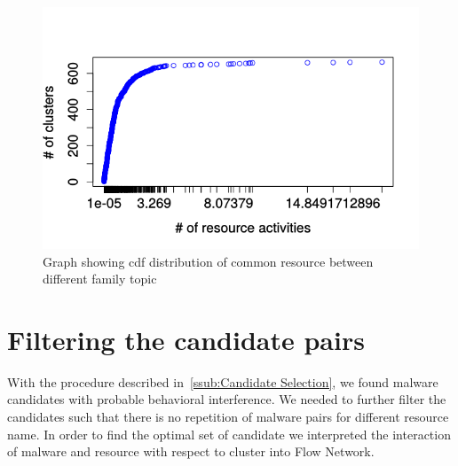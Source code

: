 \begin{figure}[htbp]
\begin{center}
  \includegraphics[scale=0.7]{figures/inter_clustered_common.png}
\end{center}
\captionsetup{font=small}
\caption{Graph showing cdf distribution of common resource between different family topic}
\label{fig:interclustcommon}
\end{figure}

\section{Filtering the candidate pairs}
\label{sec:Filtering the candidate pairs}
With the procedure described in~\autoref{ssub:Candidate Selection}, we found malware candidates with probable behavioral interference.
We needed to further filter the candidates such that there is no repetition of malware pairs for different resource name.
In order to find the optimal set of candidate we interpreted the interaction of malware and resource with respect to cluster into Flow Network.

